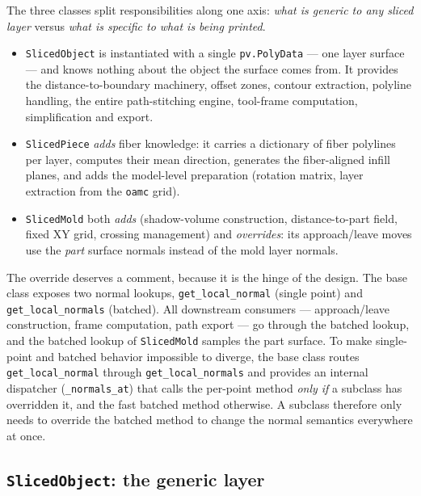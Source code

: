 The three classes split responsibilities along one axis: \emph{what is
generic to any sliced layer} versus \emph{what is specific to what is
being printed}.

\begin{itemize}
  \item \texttt{SlicedObject} is instantiated with a single
        \texttt{pv.PolyData} --- one layer surface --- and knows nothing
        about the object the surface comes from. It provides the
        distance-to-boundary machinery, offset zones, contour
        extraction, polyline handling, the entire path-stitching
        engine, tool-frame computation, simplification and export.
  \item \texttt{SlicedPiece} \emph{adds} fiber knowledge: it carries a
        dictionary of fiber polylines per layer, computes their mean
        direction, generates the fiber-aligned infill planes, and adds
        the model-level preparation (rotation matrix, layer extraction
        from the \texttt{oamc} grid).
  \item \texttt{SlicedMold} both \emph{adds} (shadow-volume
        construction, distance-to-part field, fixed XY grid, crossing
        management) and \emph{overrides}: its approach/leave moves use
        the \emph{part} surface normals instead of the mold layer
        normals.
\end{itemize}

The override deserves a comment, because it is the hinge of the
design. The base class exposes two normal lookups,
\texttt{get\_local\_normal} (single point) and
\texttt{get\_local\_normals} (batched). All downstream consumers ---
approach/leave construction, frame computation, path export --- go
through the batched lookup, and the batched lookup of
\texttt{SlicedMold} samples the part surface. To make single-point and
batched behavior impossible to diverge, the base class routes
\texttt{get\_local\_normal} through \texttt{get\_local\_normals} and
provides an internal dispatcher (\texttt{\_normals\_at}) that calls the
per-point method \emph{only if} a subclass has overridden it, and the
fast batched method otherwise. A subclass therefore only needs to
override the batched method to change the normal semantics everywhere
at once.

\subsection{\texttt{SlicedObject}: the generic layer}\label{sec:impl-object}

